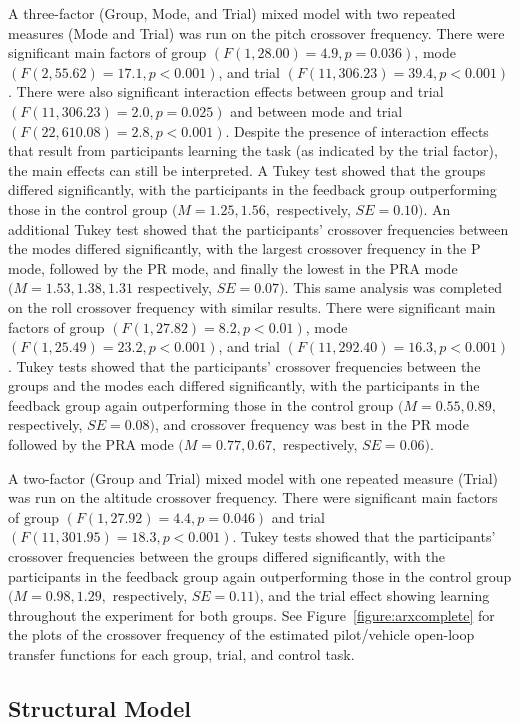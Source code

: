 A three-factor (Group, Mode, and Trial) mixed model with two repeated measures (Mode and Trial) was run on the pitch crossover frequency.
There were significant main factors of group $(F(1, 28.00) = 4.9, p = 0.036)$, mode $(F(2, 55.62) = 17.1, p < 0.001)$, and trial $(F(11, 306.23) = 39.4, p < 0.001)$.
There were also significant interaction effects between group and trial $(F(11, 306.23) = 2.0, p = 0.025)$ and between mode and trial $(F(22, 610.08) = 2.8, p < 0.001)$.
Despite the presence of interaction effects that result from participants learning the task (as indicated by the trial factor), the main effects can still be interpreted.
A Tukey test showed that the groups differed significantly, with the participants in the feedback group outperforming those in the control group $(M = 1.25, 1.56,$ respectively, $SE = 0.10)$.
An additional Tukey test showed that the participants' crossover frequencies between the modes differed significantly, with the largest crossover frequency in the P mode, followed by the PR mode, and finally the lowest in the PRA mode $(M = 1.53, 1.38, 1.31$ respectively, $SE = 0.07)$.
This same analysis was completed on the roll crossover frequency with similar results.
There were significant main factors of group $(F(1, 27.82) = 8.2, p < 0.01)$, mode $(F(1, 25.49) = 23.2, p < 0.001)$, and trial $(F(11, 292.40) = 16.3, p < 0.001)$.
Tukey tests showed that the participants' crossover frequencies between the groups and the modes each differed significantly, with the participants in the feedback group again outperforming those in the control group $(M = 0.55, 0.89,$ respectively, $SE = 0.08)$, and crossover frequency was best in the PR mode followed by the PRA mode $(M = 0.77, 0.67,$ respectively, $SE = 0.06)$.

A two-factor (Group and Trial) mixed model with one repeated measure (Trial) was run on the altitude crossover frequency.
There were significant main factors of group $(F(1, 27.92) = 4.4, p = 0.046)$ and trial $(F(11, 301.95) = 18.3, p < 0.001)$.
Tukey tests showed that the participants' crossover frequencies between the groups differed significantly, with the participants in the feedback group again outperforming those in the control group $(M = 0.98, 1.29,$ respectively, $SE = 0.11)$, and the trial effect showing learning throughout the experiment for both groups.
See Figure~\ref{figure:arxcomplete} for the plots of the crossover frequency of the estimated pilot/vehicle open-loop transfer functions for each group, trial, and control task.

\subsection{Structural Model}
